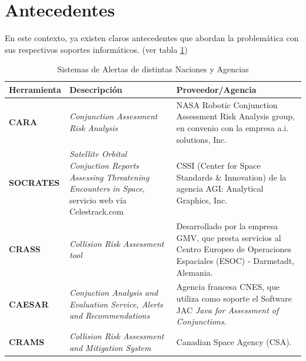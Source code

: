 {\section{Antecedentes}
En este contexto, ya existen claros antecedentes que abordan la problem\'atica con sus respectivos soportes inform\'aticos. (ver tabla \ref{tab:sisal})
\begin{table}[!h]
\centering
\begin{tabular}{|l|p{5cm}|p{6cm}|}
\hline
Herramienta & Desecripci\'on & Proveedor/Agencia\\
\hline
{\bf{CARA}} & {\it{Conjunction Assessment Risk Analysis}} & NASA Robotic Conjunction Assessment Risk Analysis group, en convenio con la empresa a.i. solutions, Inc.\\
\hline
{\bf{SOCRATES}} & {\it{Satellite Orbital Conjuction Reports Assessing Threatening Encounters in Space}}, servicio web v\'ia Celestrack.com & CSSI (Center for Space Standards \& Innovation) de la agencia AGI: Analytical Graphics, Inc.\\
\hline
{\bf{CRASS}} & {\it{Collision Risk Assessment tool}} & Desarrollado por la
empresa GMV, que presta servicios al Centro Europeo de Operaciones
Espaciales (ESOC) - Darmstadt, Alemania. \cite{alarconRodriguez}\\
\hline
{\bf{CAESAR}} & {\it{Conjuction Analysis and Evaluation Service, Alerts and Recommendations}} & Agencia francesa CNES, que utiliza como soporte el Software JAC {\it{Java for Assessment of Conjunctions}}.\cite{laporte}\\
\hline
{\bf{CRAMS}} & {\it{Collision Risk Assessment and Mitigation System}} & Canadian Space Agency (CSA). \cite{babiker}\\
\hline
\end{tabular}
\caption[Sistemas de Alerta]{Sistemas de Alertas de distintas Naciones y Agencias}
\label{tab:sisal}
\end{table}

}
